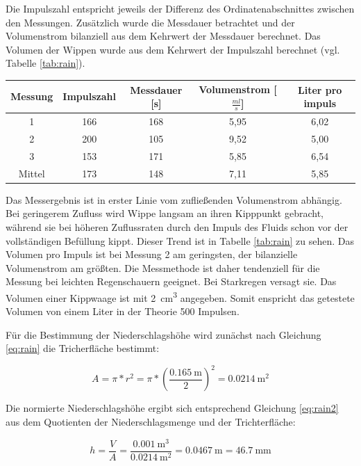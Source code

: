 Die Impulszahl entspricht jeweils der Differenz des Ordinatenabschnittes zwischen den Messungen. Zusätzlich wurde die Messdauer betrachtet und der Volumenstrom bilanziell aus dem Kehrwert der Messdauer berechnet. Das Volumen der Wippen wurde aus dem Kehrwert der Impulszahl berechnet (vgl. Tabelle \ref{tab:rain}).

 \begin{center}
 	\begin{tabular}{c|c|c|c|c}
 		\label{tab:rain}
 		\textbf{Messung} & \textbf{Impulszahl} & \textbf{Messdauer} [s] & \textbf{Volumenstrom} [$\frac{ml}{s}$] & \textbf{Liter pro impuls}\\
 		\hline
 		1 & 166 & 168 & 5,95 & 6,02\\
 		2 & 200 & 105 & 9,52 & 5,00\\
 		3 & 153 & 171 & 5,85 & 6,54\\
 		Mittel & 173 & 148 & 7,11 & 5,85
 	\end{tabular}
 \end{center}

Das Messergebnis ist in erster Linie vom zufließenden Volumenstrom abhängig. Bei geringerem Zufluss wird Wippe  langsam an ihren Kipppunkt gebracht, während sie bei höheren Zuflussraten durch den Impuls des Fluids schon vor der vollständigen Befüllung kippt. Dieser Trend ist in Tabelle \ref{tab:rain} zu sehen. Das Volumen pro Impuls ist bei Messung 2 am geringsten, der bilanzielle Volumenstrom am größten. Die Messmethode ist daher tendenziell für die Messung bei leichten Regenschauern geeignet. Bei Starkregen versagt sie. Das Volumen einer Kippwaage ist mit \SI{2}{\cubic\centi\meter} angegeben. Somit enspricht das getestete Volumen von einem Liter in der Theorie 500 Impulsen. 

Für die Bestimmung der Niederschlagshöhe wird zunächst nach Gleichung \ref{eq:rain} die Tricherfläche bestimmt:

\begin{equation}
	\label{eq:rain}
	A= \pi * r^2= \pi * (\frac{\SI{0,165}{\meter}}{2})^2 = \SI{0,0214}{\square\meter}
\end{equation}

Die normierte Niederschlagshöhe ergibt sich entsprechend Gleichung \ref{eq:rain2} aus dem Quotienten der Niederschlagsmenge und der Trichterfläche:

\begin{equation}
	\label{eq:rain2}
	h = \frac{V}{A} = \frac{\SI{0,001}{\cubic\meter}}{\SI{0,0214}{\square\meter}} = \SI{0,0467}{\meter} = \SI{46,7}{\milli\meter}
\end{equation}

